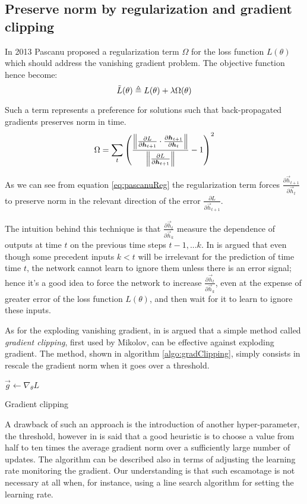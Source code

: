 \subsection{Preserve norm by regularization and gradient clipping} 
\label{sec:clipping}
In 2013 Pascanu \cite{pascanu} proposed a regularization term $\Omega$ for the loss function $L(\theta)$ which should address the vanishing gradient problem.
The objective function hence become:
\begin{equation}
 \tilde{L}(\theta) \triangleq L(\theta) + \lambda\Omega(\theta)
\end{equation}

Such a term represents a preference for solutions such that back-propagated gradients preserves norm in time.
\begin{equation}
\Omega = \sum_t \left( \frac{\left\Vert  \frac{\partial L}{\partial \boldsymbol{h}_{t+1}} \cdot \frac{\partial \boldsymbol{h}_{t+1}}{\partial \boldsymbol{h}_t}  \right\Vert}{\left\Vert \frac{\partial L}{\partial \boldsymbol{h}_{t+1}} \right\Vert} -1  \right)^2 
\label{eq:pascanuReg}
\end{equation}

As we can see from equation \ref{eq:pascanuReg} the regularization term forces $\frac{\partial \vec{h}_{t+1}}{\partial \vec{h}_t}$ to preserve norm in the relevant direction of the error $\frac{\partial L}{\partial \vec{h}_{t+1}}$.

The intuition behind this technique is that $\frac{\partial \vec{h}_{t}}{\partial \vec{h}_k}$ measure the dependence of outputs at time $t$ on the previous time steps $t-1,...k$. In \cite{pascanu} is argued that even though some precedent inputs $k<t$ will be irrelevant for the prediction of time time $t$, the network cannot learn to ignore them unless there is an error signal; hence it's a good idea to force the network to increase $\frac{\partial \vec{h}_{t}}{\partial \vec{h}_k}$, even at the expense of greater error of the loss function $L(\theta)$, and then wait for it to learn to ignore these inputs.

As for the exploding vanishing gradient, in \cite{pascanu} is argued that a simple method called \textit{gradient clipping}, first used by Mikolov\cite{clippingMikolov}, can be effective against exploding gradient. The method, shown in algorithm \ref{algo:gradClipping}, simply consists in rescale the gradient norm when it goes over a threshold.

\begin{algorithm}[]
$\vec{g} \gets \nabla_{\theta} L$\\
\caption{Gradient clipping}
\label{algo:gradClipping}
\end{algorithm}

A drawback of such an approach is the introduction of another hyper-parameter, the threshold, however in \cite{pascanu} is said that a good heuristic
is to choose a value from half to ten times the average gradient norm over a sufficiently large number of updates.
The algorithm can be described also in terms of adjusting the learning rate monitoring the gradient. Our understanding is that such escamotage is not necessary at all when, for instance, using a line search algorithm for setting the learning rate.